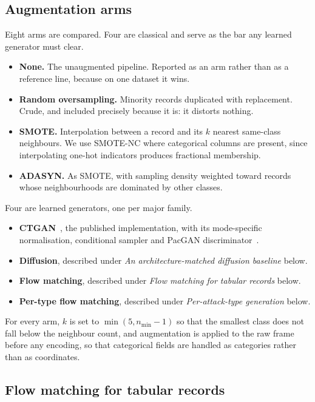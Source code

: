 \documentclass[11pt]{article}
\begin{document}
\subsection*{Augmentation arms}

Eight arms are compared. Four are classical and serve as the bar any learned
generator must clear.

\begin{itemize}
\item \textbf{None.} The unaugmented pipeline. Reported as an arm rather than as a
      reference line, because on one dataset it wins.
\item \textbf{Random oversampling.} Minority records duplicated with replacement.
      Crude, and included precisely because it is: it distorts nothing.
\item \textbf{SMOTE.} Interpolation between a record and its $k$ nearest same-class
      neighbours. We use SMOTE-NC where categorical columns are present, since
      interpolating one-hot indicators produces fractional membership.
\item \textbf{ADASYN.} As SMOTE, with sampling density weighted toward records whose
      neighbourhoods are dominated by other classes.
\end{itemize}

Four are learned generators, one per major family.

\begin{itemize}
\item \textbf{CTGAN}~\cite{xu2019modeling}, the published implementation, with its
      mode-specific normalisation, conditional sampler and PacGAN discriminator~\cite{lin2018pacgan}.
\item \textbf{Diffusion}, described under \emph{An architecture-matched diffusion baseline} below.
\item \textbf{Flow matching}, described under \emph{Flow matching for tabular records} below.
\item \textbf{Per-type flow matching}, described under \emph{Per-attack-type generation} below.
\end{itemize}

For every arm, $k$ is set to $\min(5, n_{\min}-1)$ so that the smallest class does
not fall below the neighbour count, and augmentation is applied to the raw frame
before any encoding, so that categorical fields are handled as categories rather
than as coordinates.

\subsection*{Flow matching for tabular records}
\end{document}
